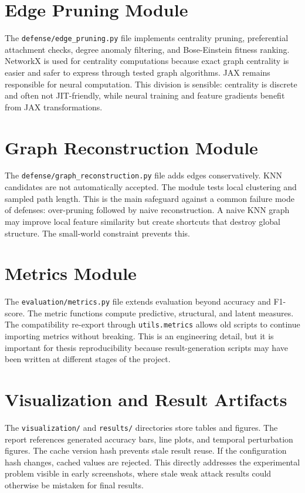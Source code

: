 \documentclass[12pt,oneside]{report}
\begin{document}
\section{Edge Pruning Module}
The \texttt{defense/edge\_pruning.py} file implements centrality pruning, preferential attachment checks, degree anomaly filtering, and Bose-Einstein fitness ranking. NetworkX is used for centrality computations because exact graph centrality is easier and safer to express through tested graph algorithms. JAX remains responsible for neural computation. This division is sensible: centrality is discrete and often not JIT-friendly, while neural training and feature gradients benefit from JAX transformations.

\section{Graph Reconstruction Module}
The \texttt{defense/graph\_reconstruction.py} file adds edges conservatively. KNN candidates are not automatically accepted. The module tests local clustering and sampled path length. This is the main safeguard against a common failure mode of defenses: over-pruning followed by naive reconstruction. A naive KNN graph may improve local feature similarity but create shortcuts that destroy global structure. The small-world constraint prevents this.

\section{Metrics Module}
The \texttt{evaluation/metrics.py} file extends evaluation beyond accuracy and F1-score. The metric functions compute predictive, structural, and latent measures. The compatibility re-export through \texttt{utils.metrics} allows old scripts to continue importing metrics without breaking. This is an engineering detail, but it is important for thesis reproducibility because result-generation scripts may have been written at different stages of the project.

\section{Visualization and Result Artifacts}
The \texttt{visualization/} and \texttt{results/} directories store tables and figures. The report references generated accuracy bars, line plots, and temporal perturbation figures. The cache version hash prevents stale result reuse. If the configuration hash changes, cached values are rejected. This directly addresses the experimental problem visible in early screenshots, where stale weak attack results could otherwise be mistaken for final results.
\end{document}
